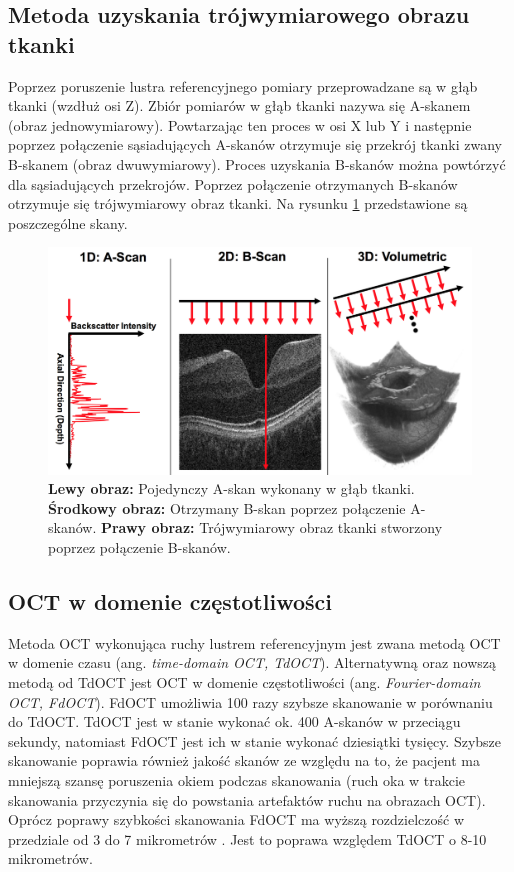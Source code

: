 \subsection{Metoda uzyskania trójwymiarowego obrazu tkanki}

Poprzez poruszenie lustra referencyjnego pomiary przeprowadzane są w głąb tkanki (wzdłuż osi Z). Zbiór pomiarów w głąb tkanki nazywa się A-skanem (obraz jednowymiarowy). Powtarzając ten proces w osi X lub Y i następnie poprzez połączenie sąsiadujących A-skanów otrzymuje się przekrój tkanki zwany B-skanem (obraz dwuwymiarowy). Proces uzyskania B-skanów można powtórzyć dla sąsiadujących przekrojów. Poprzez połączenie otrzymanych B-skanów otrzymuje się trójwymiarowy obraz tkanki. Na rysunku \ref{fig:obrazowanie_oct:scan} \cite{Kraus:12} przedstawione są poszczególne skany.

\begin{figure}[htb]
	\centering
	\includegraphics[width=\textwidth]{gfx/scans}
	\caption{\cite{Kraus:12} \textbf{Lewy obraz:} Pojedynczy A-skan wykonany w głąb tkanki. \textbf{Środkowy obraz:} Otrzymany B-skan poprzez połączenie A-skanów. \textbf{Prawy obraz:} Trójwymiarowy obraz tkanki stworzony poprzez połączenie B-skanów.}
	\label{fig:obrazowanie_oct:scan}
\end{figure}

\subsection{OCT w domenie częstotliwości}

Metoda OCT wykonująca ruchy lustrem referencyjnym jest zwana metodą OCT w domenie czasu (ang. \textit{time-domain OCT, TdOCT}). Alternatywną oraz nowszą metodą od TdOCT jest OCT w domenie częstotliwości (ang. \textit{Fourier-domain OCT, FdOCT}). FdOCT umożliwia 100 razy szybsze \cite{Strong:11} skanowanie w porównaniu do TdOCT. TdOCT jest w stanie wykonać ok. 400 A-skanów w przeciągu sekundy, natomiast FdOCT jest ich w stanie wykonać dziesiątki tysięcy. Szybsze skanowanie poprawia również jakość skanów ze względu na to, że pacjent ma mniejszą szansę poruszenia okiem podczas skanowania (ruch oka w trakcie skanowania przyczynia się do powstania artefaktów ruchu na obrazach OCT). Oprócz poprawy szybkości skanowania FdOCT ma wyższą rozdzielczość w przedziale od 3 do 7 mikrometrów \cite{Strong:11}. Jest to poprawa względem TdOCT o 8-10 mikrometrów.

